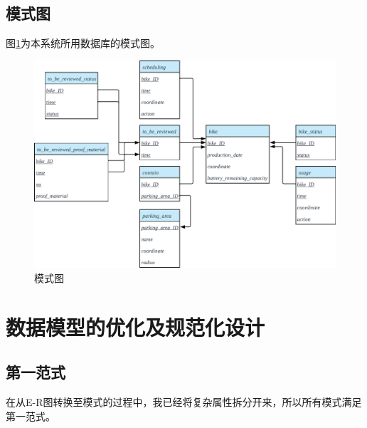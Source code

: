 \subsection{模式图}

图\ref{schema}为本系统所用数据库的模式图。

\begin{figure}[!htbp]
    \centering
    \includegraphics[width=\textwidth]{figures/schema.pdf}
    \caption{模式图}\label{schema}
\end{figure}

\section{数据模型的优化及规范化设计}

\subsection{第一范式}
在从E-R图转换至模式的过程中，我已经将复杂属性拆分开来，所以所有模式满足第一范式。
